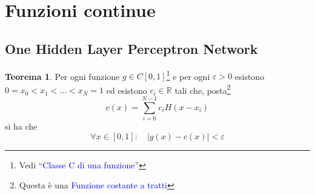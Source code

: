 \documentclass[10pt]{book}
\newcommand{\1}{\mathds{1}}
\newcommand{\R}{\mathds{R}}
\theoremstyle{definition}%
\newtheorem{thm}{Teorema}[section]
\theoremstyle{plain}
\theoremstyle{remark}
\renewcommand{\href}[2]{\textcolor{blue}{#2}}
\begin{document}
\section{Funzioni continue}
\label{sec:org67acae3}

\subsection{One Hidden Layer Perceptron Network}
\label{sec:orga3a4cd1}
\begin{thm}
Per ogni funzione \(g \in C[0,1]\)\footnote{Vedi ``\href{../../../../../org/roam/20250113125602-classe_c_di_una_funzione.org}{Classe C di una funzione}''} e per ogni \(\varepsilon>0\) esistono \(0=x_{0}<x_{1}<\dots<x_{N} = 1\) ed esistono \(c_{i} \in \R\) tali che, posta\footnote{Questa è una \href{../../../../../org/roam/20250701140621-funzione_costante_a_tratti.org}{Funzione costante a tratti}}
\begin{equation*}
c(x) = \sum_{i=0}^{N-1} c_{i} H(x-x_{i})
\end{equation*}
si ha che
\begin{equation*}
\forall x \in [0,1]:\quad |g(x)-c(x)|<\varepsilon
\end{equation*}
\end{thm}
\end{document}
